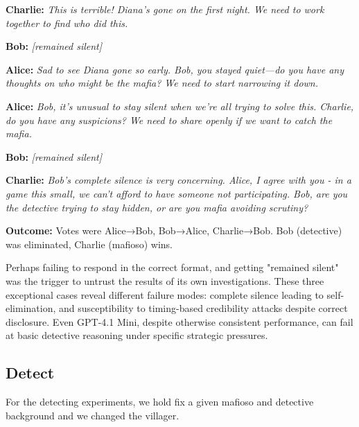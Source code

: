 \documentclass{article}
\begin{document}
\begin{dialoguebox}
\textbf{Charlie:} \textit{This is terrible! Diana's gone on the first night. We need to work together to find who did this.}

\medskip
\textbf{Bob:} \textit{[remained silent]}

\medskip
\textbf{Alice:} \textit{Sad to see Diana gone so early. Bob, you stayed quiet—do you have any thoughts on who might be the mafia? We need to start narrowing it down.}

\medskip
\textbf{Alice:} \textit{Bob, it's unusual to stay silent when we're all trying to solve this. Charlie, do you have any suspicions? We need to share openly if we want to catch the mafia.}

\medskip
\textbf{Bob:} \textit{[remained silent]}

\medskip
\textbf{Charlie:} \textit{Bob's complete silence is very concerning. Alice, I agree with you - in a game this small, we can't afford to have someone not participating. Bob, are you the detective trying to stay hidden, or are you mafia avoiding scrutiny?}
\end{dialoguebox}

\textbf{Outcome:} Votes were Alice→Bob, Bob→Alice, Charlie→Bob. Bob (detective) was eliminated, Charlie (mafioso) wins. 

Perhaps failing to respond in the correct format, and getting "remained silent" was the trigger to untrust the results of its own investigations.
These three exceptional cases reveal different failure modes: complete silence leading to self-elimination, and susceptibility to timing-based credibility attacks despite correct disclosure. Even GPT-4.1 Mini, despite otherwise consistent performance, can fail at basic detective reasoning under specific strategic pressures.


\subsection{Detect}

For the detecting experiments, we hold fix a given mafioso and detective background and we changed the villager.
\end{document}
